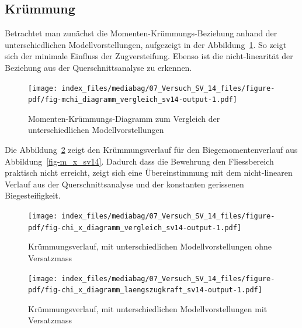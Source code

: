 \documentclass[
  12pt,
  letterpaper,
  egregdoesnotlikesansseriftitles]{scrreprt}
\begin{document}
\hypertarget{kruxfcmmung-1}{%
\subsection{Krümmung}\label{kruxfcmmung-1}}

Betrachtet man zunächst die Momenten-Krümmungs-Beziehung anhand der
unterschiedlichen Modellvorstellungen, aufgezeigt in der
Abbildung~\ref{fig-mchi_diagramm_vergleich_sv14}. So zeigt sich der
minimale Einfluss der Zugversteifung. Ebenso ist die nicht-linearität
der Beziehung aus der Querschnittsanalyse zu erkennen.

\begin{figure}[H]

{\centering \texttt{[image: index\_files/mediabag/07\_Versuch\_SV\_14\_files/figure-pdf/fig-mchi\_diagramm\_vergleich\_sv14-output-1.pdf]}

}

\caption{\label{fig-mchi_diagramm_vergleich_sv14}Momenten-Krümmungs-Diagramm
zum Vergleich der unterschiedlichen Modellvorstellungen}

\end{figure}

Die Abbildung~\ref{fig-chi_x_diagramm_vergleich_sv14} zeigt den
Krümmungsverlauf für den Biegemomentenverlauf aus
Abbildung~\ref{fig-m_x_sv14}. Dadurch dass die Bewehrung den
Fliessbereich praktisch nicht erreicht, zeigt sich eine Übereinstimmung
mit dem nicht-linearen Verlauf aus der Querschnittsanalyse und der
konstanten gerissenen Biegesteifigkeit.

\begin{figure}[H]

{\centering \texttt{[image: index\_files/mediabag/07\_Versuch\_SV\_14\_files/figure-pdf/fig-chi\_x\_diagramm\_vergleich\_sv14-output-1.pdf]}

}

\caption{\label{fig-chi_x_diagramm_vergleich_sv14}Krümmungsverlauf, mit
unterschiedlichen Modellvorstellungen ohne Versatzmass}

\end{figure}

\begin{figure}[H]

{\centering \texttt{[image: index\_files/mediabag/07\_Versuch\_SV\_14\_files/figure-pdf/fig-chi\_x\_diagramm\_laengszugkraft\_sv14-output-1.pdf]}

}

\caption{\label{fig-chi_x_diagramm_laengszugkraft_sv14}Krümmungsverlauf,
mit unterschiedlichen Modellvorstellungen mit Versatzmass}

\end{figure}
\end{document}
